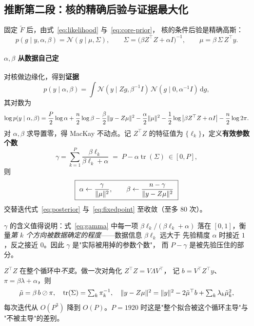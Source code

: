\documentclass[11pt,a4paper]{article}
\begin{document}
\subsection{推断第二段：核的精确后验与证据最大化}
\label{sec:stage2}

固定 $\tilde F$ 后，由式~\eqref{eq:likelihood} 与~\eqref{eq:core-prior}，
核的条件后验是精确高斯：
\begin{equation}
p(g\mid y,\alpha,\beta)=\mathcal N(g\mid\mu,\Sigma),
\qquad
\Sigma=\big(\beta Z^\top Z+\alpha I\big)^{-1},
\qquad
\mu=\beta\,\Sigma\,Z^\top y .
\label{eq:posterior}
\end{equation}

\paragraph{$\alpha,\beta$ 从数据自己定} 对核做边缘化，得到\textbf{证据}
\begin{equation}
p(y\mid\alpha,\beta)=\int\!\mathcal N(y\mid Zg,\beta^{-1}I)\,
\mathcal N(g\mid0,\alpha^{-1}I)\,\mathrm dg,
\end{equation}
其对数为
\begin{equation}
\log p(y\mid\alpha,\beta)=\frac{P}{2}\log\alpha+\frac{n}{2}\log\beta
-\frac{\beta}{2}\lVert y-Z\mu \rVert^2-\frac{\alpha}{2}\lVert \mu \rVert^2
-\frac12\log\big|\beta Z^\top Z+\alpha I\big|-\frac n2\log2\pi .
\label{eq:evidence}
\end{equation}
对 $\alpha,\beta$ 求导置零，得 MacKay 不动点。记 $Z^\top Z$ 的特征值为
$\{\ell_k\}$，定义\textbf{有效参数个数}
\begin{equation}
\gamma=\sum_{k=1}^{P}\frac{\beta\ell_k}{\beta\ell_k+\alpha}
\;=\;P-\alpha\operatorname{tr}(\Sigma)\ \in[0,P],
\label{eq:gamma}
\end{equation}
则
\begin{equation}
\boxed{\ \alpha\leftarrow\frac{\gamma}{\norm{\mu}^2},
\qquad
\beta\leftarrow\frac{n-\gamma}{\norm{y-Z\mu}^2}\ }
\label{eq:fixedpoint}
\end{equation}
交替迭代式~\eqref{eq:posterior} 与~\eqref{eq:fixedpoint} 至收敛（至多 $80$ 次）。

$\gamma$ 的含义值得说明：式~\eqref{eq:gamma} 中每一项 $\beta\ell_k/(\beta\ell_k+\alpha)$
落在 $[0,1]$，衡量\emph{第 $k$ 个方向被数据确定的程度}——数据信息 $\beta\ell_k$ 远大于
先验精度 $\alpha$ 时接近 $1$，反之接近 $0$。因此 $\gamma$ 是"实际被用掉的参数个数"，
而 $P-\gamma$ 是被先验压住的部分。

\begin{principle}[在特征基中迭代]
$Z^\top Z$ 在整个循环中\emph{不变}。做一次对角化 $Z^\top Z=V\Lambda V^\top$，
记 $b=V^\top Z^\top y$、$\pi=\beta\lambda+\alpha$，则
\begin{equation*}
\tilde\mu=\beta\,b\oslash\pi,\quad
\operatorname{tr}(\Sigma)=\textstyle\sum_k\pi_k^{-1},\quad
\lVert y-Z\mu \rVert^2=\lVert y \rVert^2-2\tilde\mu^\top b+\textstyle\sum_k\lambda_k\tilde\mu_k^2 ,
\end{equation*}
每次迭代从 $O(P^3)$ 降到 $O(P)$。$P=1920$ 时这是"整个拟合被这个循环主导"与
"不被主导"的差别。
\end{principle}
\end{document}
